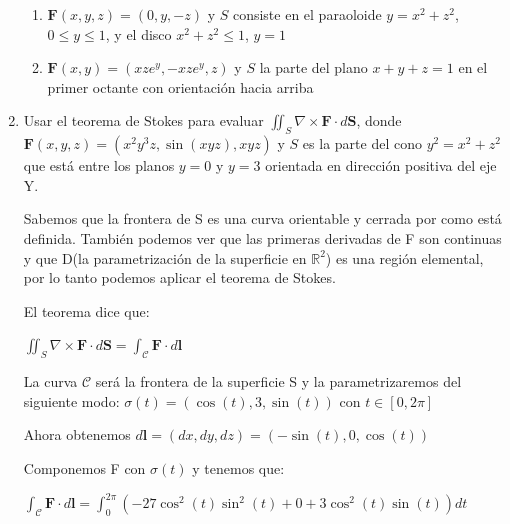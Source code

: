 \documentclass{article}
\begin{document}
\begin{enumerate}
{            \begin{enumerate}
            \item{
                $\mathbf{F} (x,y,z) = (0,y,-z)$ y $S$ consiste en el paraoloide
                $y = x^2 + z^2$, $0 \leq y \leq 1$, y el disco
                $x^2 + z^2 \leq 1$, $y = 1$

			\color{azul}


            }

            \item{
            	$\mathbf{F} (x,y) = (xze^y,-xze^y,z)$ y $S$ la parte del plano $x + y+ z = 1$ en el primer octante con orientación hacia arriba

           \color{azul}

            }
            \end{enumerate}


        }

        \item {
            Usar el teorema de Stokes para evaluar $\displaystyle\iint_{S} \nabla \times \mathbf{F} \cdot d\mathbf{S}$, donde $\mathbf{F}(x,y,z) =(x^2y^3z,\sin(xyz),xyz)$ y $S$ es la parte del cono $y^2 = x^2 + z^2$ que está entre los planos $y = 0$ y $y = 3$ orientada en dirección positiva del eje Y.

            \color{azul}
            Sabemos que la frontera de S es una curva orientable y cerrada por
            como está definida. También podemos ver que las primeras derivadas
            de F son continuas y que D(la parametrización de la superficie en
            $\mathbb{R}^2$) es una región elemental, por lo tanto podemos
            aplicar el teorema de Stokes.

            El teorema dice que:

            $\iint_{S} \nabla \times \mathbf{F} \cdot d\mathbf{S} = \int_{\mathcal{C}} \mathbf{F} \cdot d\mathbf{l}$

            La curva $\mathcal{C}$ será la frontera de la superficie S y la parametrizaremos del siguiente modo: $\sigma(t) = (\cos(t), 3, \sin(t))$ con $t \in [0, 2\pi]$

            Ahora obtenemos $d\mathbf{l} = (dx, dy, dz) = (-\sin(t), 0, \cos(t))$

        Componemos F con $\sigma(t)$ y tenemos que:

        $\int_{\mathcal{C}} \mathbf{F} \cdot d\mathbf{l} = \int_{0}^{2\pi} (-27\cos^2(t)\sin^2(t) + 0 + 3\cos^2(t)\sin(t)) dt$

}
\end{enumerate}
\end{document}
